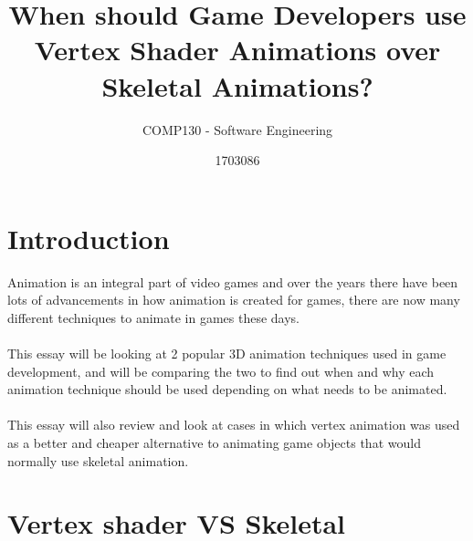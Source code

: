 \documentclass{scrartcl}
\title{When should Game Developers use Vertex Shader Animations over Skeletal Animations?}
\subtitle{COMP130 - Software Engineering}
\author{1703086}
\begin{document}
\maketitle


\section{Introduction}
Animation is an integral part of video games and over the years there have been lots of advancements in how animation is created for games, there are now many different techniques to animate in games these days.
\\~\\
This essay will be looking at 2 popular 3D animation techniques used in game development, and will be comparing the two to find out when and why each animation technique should be used depending on what needs to be animated.
\\~\\
This essay will also review and look at cases in which vertex animation was used as a better and cheaper alternative to animating game objects that would normally use skeletal animation.


\section{Vertex shader VS Skeletal}
\end{document}
